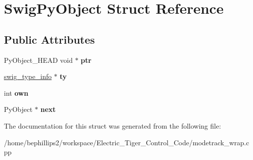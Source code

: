 \hypertarget{struct_swig_py_object}{\section{Swig\-Py\-Object Struct Reference}
\label{struct_swig_py_object}
}
\subsection*{Public Attributes}
\begin{DoxyCompactItemize}
\item 
\hypertarget{struct_swig_py_object_a41b1d569a8ba4fa9b1d87579c144891b}{Py\-Object\-\_\-\-H\-E\-A\-D void $\ast$ {\bfseries ptr}}\label{struct_swig_py_object_a41b1d569a8ba4fa9b1d87579c144891b}

\item 
\hypertarget{struct_swig_py_object_a510b5a6f66a8a33c0a54c3eeb83e5ba5}{\hyperlink{structswig__type__info}{swig\-\_\-type\-\_\-info} $\ast$ {\bfseries ty}}\label{struct_swig_py_object_a510b5a6f66a8a33c0a54c3eeb83e5ba5}

\item 
\hypertarget{struct_swig_py_object_a83cb6489fb1b171467f06c091ae6f283}{int {\bfseries own}}\label{struct_swig_py_object_a83cb6489fb1b171467f06c091ae6f283}

\item 
\hypertarget{struct_swig_py_object_af7b93d7ae49a6f3bdf6511043fe8e839}{Py\-Object $\ast$ {\bfseries next}}\label{struct_swig_py_object_af7b93d7ae49a6f3bdf6511043fe8e839}

\end{DoxyCompactItemize}


The documentation for this struct was generated from the following file\-:\begin{DoxyCompactItemize}
\item 
/home/bephillips2/workspace/\-Electric\-\_\-\-Tiger\-\_\-\-Control\-\_\-\-Code/modetrack\-\_\-wrap.\-cpp\end{DoxyCompactItemize}
